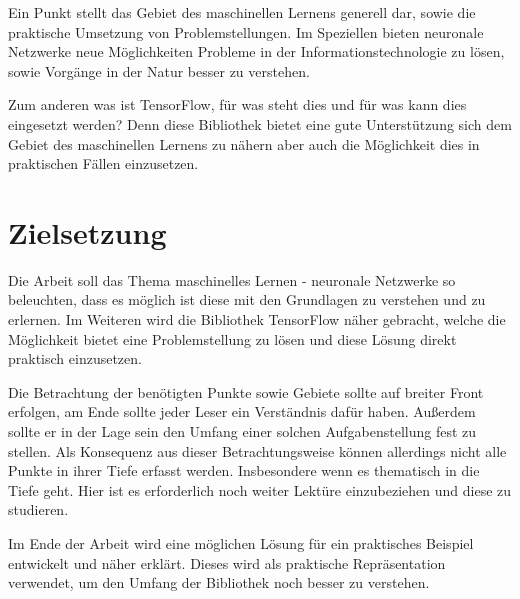 \noindent
Ein Punkt stellt das Gebiet des maschinellen Lernens generell dar, sowie die praktische Umsetzung von Problemstellungen. 
Im Speziellen bieten neuronale Netzwerke neue Möglichkeiten Probleme in der Informationstechnologie zu lösen, sowie Vorgänge in der Natur besser zu verstehen. \newline

\noindent
Zum anderen was ist TensorFlow, für was steht dies und für was kann dies eingesetzt werden?  
Denn diese Bibliothek bietet eine gute Unterstützung sich dem Gebiet des maschinellen Lernens zu nähern aber auch die Möglichkeit dies in praktischen Fällen einzusetzen. 


\section{Zielsetzung}


Die Arbeit soll das Thema maschinelles Lernen - neuronale Netzwerke so beleuchten, dass es möglich ist diese mit den Grundlagen zu verstehen und zu erlernen. 
Im Weiteren wird die Bibliothek TensorFlow näher gebracht, welche die Möglichkeit bietet eine Problemstellung zu lösen und diese Lösung direkt praktisch einzusetzen. \newline

\noindent
Die Betrachtung der benötigten Punkte sowie Gebiete sollte auf breiter Front erfolgen, am Ende sollte jeder Leser ein Verständnis dafür haben. 
Außerdem sollte er in der Lage sein den Umfang einer solchen Aufgabenstellung fest zu stellen. 
Als Konsequenz aus dieser Betrachtungsweise können allerdings nicht alle Punkte in ihrer Tiefe erfasst werden. 
Insbesondere wenn es thematisch in die Tiefe geht. 
Hier ist es erforderlich noch weiter Lektüre einzubeziehen und diese zu studieren. \newline

\noindent
Im Ende der Arbeit wird eine möglichen Lösung für ein praktisches Beispiel entwickelt und näher erklärt.
Dieses wird als praktische Repräsentation verwendet, um den Umfang der Bibliothek noch besser zu verstehen. \newline

